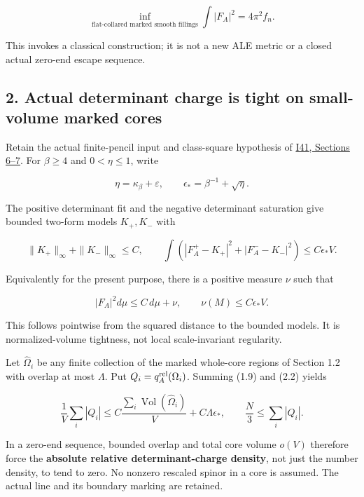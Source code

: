 \documentclass[
  11pt,
]{article}
\begin{document}
\[
 \inf_{\text{flat-collared marked smooth fillings}}
                   \int|F_A|^2=4\pi^2 f_n.
 \tag{1.10}
\]

This invokes a classical construction; it is not a new ALE metric or a
closed actual zero-end escape sequence.

\hypertarget{actual-determinant-charge-is-tight-on-small-volume-marked-cores}{%
\subsection{2. Actual determinant charge is tight on small-volume marked
cores}\label{actual-determinant-charge-is-tight-on-small-volume-marked-cores}}

Retain the actual finite-pencil input and class-square hypothesis of
\href{20260927_conformal_separation_and_zero_end.md}{I41, Sections
6--7}. For \(\beta\ge4\) and \(0<\eta\le1\), write

\[
 \eta=\kappa_\beta+\varepsilon,\qquad
 \epsilon_*=\beta^{-1}+\sqrt\eta.
\]

The positive determinant fit and the negative determinant saturation
give bounded two-form models \(K_+,K_-\) with

\[
 \|K_+\|_\infty+\|K_-\|_\infty\le C,\qquad
 \int(|F_A^+-K_+|^2+|F_A^--K_-|^2)\le C\epsilon_*V.
 \tag{2.1}
\]

Equivalently for the present purpose, there is a positive measure
\(\nu\) such that

\[
 |F_A|^2d\mu\le C\,d\mu+\nu,\qquad
                        \nu(M)\le C\epsilon_*V.
 \tag{2.2}
\]

This follows pointwise from the squared distance to the bounded models.
It is normalized-volume tightness, not local scale-invariant regularity.

Let \(\widehat\Omega_i\) be any finite collection of the marked
whole-core regions of Section 1.2 with overlap at most \(\Lambda\). Put
\(Q_i=q_A^{\rm rel}(\Omega_i)\). Summing (1.9) and (2.2) yields

\[
 \boxed{\frac1V\sum_i|Q_i|
 \le C\frac{\sum_i\operatorname{Vol}(\widehat\Omega_i)}V
                          +C\Lambda\epsilon_*,
 \qquad \frac N3\le\sum_i|Q_i|.}
 \tag{2.3}
\]

In a zero-end sequence, bounded overlap and total core volume \(o(V)\)
therefore force the \textbf{absolute relative determinant-charge
density}, not just the number density, to tend to zero. No nonzero
rescaled spinor in a core is assumed. The actual line and its boundary
marking are retained.
\end{document}
